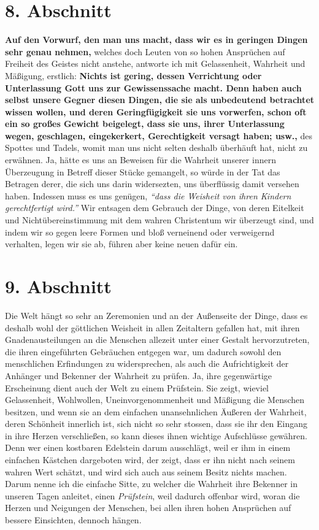 \section{8. Abschnitt} \label{kap9_ab8}

\label{ref:09_08_vorwurff} \textbf{Auf den Vorwurf, den man uns macht, dass wir
es
in geringen Dingen sehr
genau
nehmen,} welches doch Leuten von so hohen Ansprüchen auf Freiheit des Geistes
nicht anstehe, antworte ich mit Gelassenheit, Wahrheit und Mäßigung, erstlich:
\textbf{Nichts ist gering, dessen Verrichtung oder Unterlassung Gott uns zur
Gewissenssache macht. Denn haben auch selbst unsere Gegner diesen Dingen, die
sie als unbedeutend betrachtet wissen wollen, und deren Geringfügigkeit sie uns
vorwerfen, schon oft ein so großes Gewicht beigelegt, dass sie uns, ihrer
Unterlassung wegen, geschlagen, eingekerkert, Gerechtigkeit versagt haben;
usw.,} des Spottes und Tadels, womit man uns nicht selten deshalb
überhäuft
hat, nicht zu erwähnen. Ja, hätte es uns an Beweisen für die Wahrheit unserer
innern Überzeugung in Betreff dieser Stücke gemangelt, so würde in der Tat
das Betragen derer, die sich uns darin widersezten, uns überflüssig damit
versehen haben. Indessen muss es uns genügen,
\textit{"`dass die Weisheit von ihren Kindern gerechtfertigt
wird."'}
Wir entsagen dem Gebrauch
der Dinge, von deren Eitelkeit und Nichtübereinstimmung mit dem wahren
Christentum wir überzeugt sind, und indem wir so gegen leere Formen und bloß
verneinend oder verweigernd verhalten, legen wir sie ab, führen aber keine neuen
dafür ein.

\section{9. Abschnitt} \label{kap9_ab9}

Die Welt hängt so sehr an Zeremonien und an der Außenseite der Dinge, dass es
deshalb wohl der göttlichen Weisheit in allen Zeitaltern gefallen hat, mit ihren
Gnadenausteilungen an die Menschen allezeit unter einer Gestalt hervorzutreten,
die ihren eingeführten Gebräuchen entgegen war, um dadurch sowohl den
menschlichen Erfindungen zu widersprechen, als auch die Aufrichtigkeit der
Anhänger und Bekenner der Wahrheit zu prüfen. Ja,
ihre
gegenwärtige Erscheinung
dient auch der Welt zu einem Prüfstein. Sie zeigt, wieviel Gelassenheit,
Wohlwollen, Uneinvorgenommenheit und Mäßigung die Menschen besitzen, und wenn
sie
an dem einfachen unansehnlichen Äußeren der Wahrheit, deren Schönheit innerlich
ist, sich nicht so sehr stossen, dass sie ihr den Eingang in ihre Herzen
verschließen, so kann dieses ihnen wichtige Aufschlüsse gewähren. Denn wer einen
kostbaren Edelstein darum ausschlägt, weil er ihm in einem einfachen
Kästchen dargeboten wird, der zeigt, dass er ihn nicht nach seinem wahren Wert
schätzt, und wird sich auch aus seinem Besitz nichts machen. Darum nenne ich die
einfache Sitte, zu welcher die Wahrheit ihre Bekenner in unseren Tagen anleitet,
einen \textit{Prüfstein}, weil dadurch offenbar wird, woran die Herzen und
Neigungen
der Menschen, bei allen ihren hohen Ansprüchen auf bessere Einsichten, dennoch
hängen.

